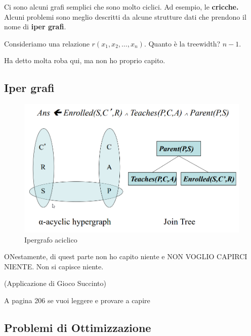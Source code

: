 Ci sono alcuni grafi semplici che sono molto ciclici. Ad esempio, le \textbf{cricche.}
Alcuni problemi sono meglio descritti da alcune strutture dati che prendono il nome di \textbf{iper grafi}.

Consideriamo una relazione $r(x_1,x_2, \dots, x_n)$. Quanto è la treewidth? $n-1$.

Ha detto molta roba qui, ma non ho proprio capito.

\subsection{Iper grafi}

\begin{figure}[H]
    \includegraphics[scale=0.5]{chapters/images/hyper aciclic.png}
    \caption{Ipergrafo aciclico}
\end{figure}

ONestamente, di quest parte non ho capito niente e NON VOGLIO CAPIRCI NIENTE. Non si capisce niente.


\begin{esempio}
    (Applicazione di Gioco Succinto)

    A pagina 206 se vuoi leggere e provare a capire
\end{esempio}

\subsection{Problemi di Ottimizzazione}



\newpage